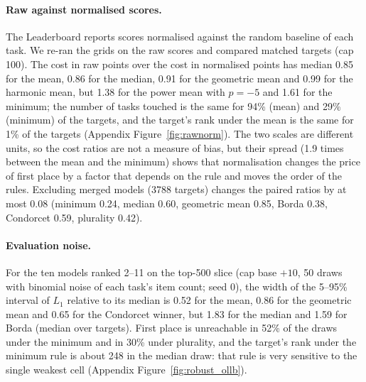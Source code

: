 \paragraph{Raw against normalised scores.}
\label{sec:rawnorm}
The Leaderboard reports scores normalised against the random baseline of each task. We re-ran the grids on the raw scores and compared matched targets (cap 100). The cost in raw points over the cost in normalised points has median 0.85 for the mean, 0.86 for the median, 0.91 for the geometric mean and 0.99 for the harmonic mean, but 1.38 for the power mean with $p=-5$ and 1.61 for the minimum; the number of tasks touched is the same for 94\% (mean) and 29\% (minimum) of the targets, and the target's rank under the mean is the same for 1\% of the targets (Appendix Figure~\ref{fig:rawnorm}). The two scales are different units, so the cost ratios are not a measure of bias, but their spread (1.9 times between the mean and the minimum) shows that normalisation changes the price of first place by a factor that depends on the rule and moves the order of the rules. Excluding merged models (3788 targets) changes the paired ratios by at most 0.08 (minimum 0.24, median 0.60, geometric mean 0.85, Borda 0.38, Condorcet 0.59, plurality 0.42).

\paragraph{Evaluation noise.}
For the ten models ranked 2--11 on the top-500 slice (cap base $+10$, 50 draws with binomial noise of each task's item count; seed 0), the width of the 5--95\% interval of $L_1$ relative to its median is 0.52 for the mean, 0.86 for the geometric mean and 0.65 for the Condorcet winner, but 1.83 for the median and 1.59 for Borda (median over targets). First place is unreachable in 52\% of the draws under the minimum and in 30\% under plurality, and the target's rank under the minimum rule is about 248 in the median draw: that rule is very sensitive to the single weakest cell (Appendix Figure~\ref{fig:robust_ollb}).
